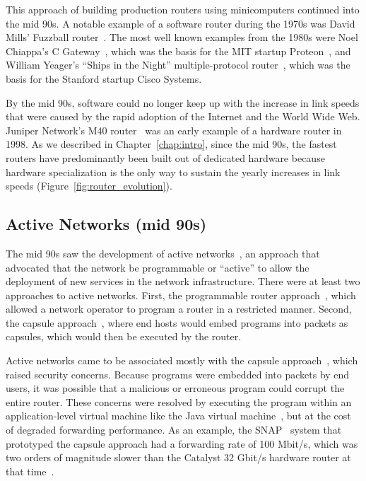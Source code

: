 This approach of building production routers using minicomputers continued into
the mid 90s.  A notable example of a software router during the 1970s was David
Mills' Fuzzball router~\cite{fuzzball}. The most well known examples from the
1980s were Noel Chiappa's C Gateway~\cite{cgw}, which was the basis for the MIT
startup Proteon~\cite{proteon}, and William Yeager's ``Ships in the Night''
multiple-protocol router~\cite{ships}, which was the basis for the Stanford
startup Cisco Systems.

By the mid 90s, software could no longer keep up with the increase in link
speeds that were caused by the rapid adoption of the Internet and the World
Wide Web. Juniper Network's M40 router~\cite{juniperm40} was an early example
of a hardware router in 1998.  As we described in Chapter~\ref{chap:intro},
since the mid 90s, the fastest routers have predominantly been built out of
dedicated hardware because hardware specialization is the only way to sustain
the yearly increases in link speeds (Figure~\ref{fig:router_evolution}).

\subsection{Active Networks (mid 90s)}
The mid 90s saw the development of active networks~\cite{ants, switchware}, an
approach that advocated that the network be programmable or ``active'' to allow
the deployment of new services in the network infrastructure. There were at
least two approaches to active networks. First, the programmable router
approach~\cite{switchware}, which allowed a network operator to program a
router in a restricted manner. Second, the capsule approach~\cite{ants}, where
end hosts would embed programs into packets as capsules, which would then be
executed by the router.

Active networks came to be associated mostly with the capsule
approach~\cite{sdn_history}, which raised security concerns. Because programs
were embedded into packets by end users, it was possible that a malicious or
erroneous program could corrupt the entire router. These concerns were resolved
by executing the program within an application-level virtual machine like the
Java virtual machine~\cite{ants}, but at the cost of degraded forwarding
performance. As an example, the SNAP~\cite{snap} system that prototyped the
capsule approach had a forwarding rate of 100 Mbit/s, which was two orders of
magnitude slower than the Catalyst 32 Gbit/s hardware router at that
time~\cite{catalyst}.

